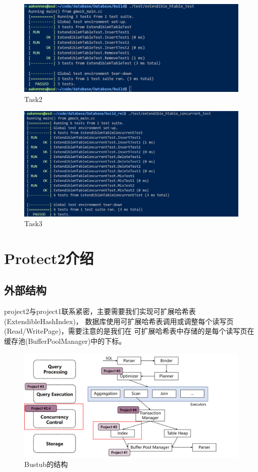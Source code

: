 \documentclass[a4paper]{article}
\begin{document}
\begin{figure}[h!]
   \centering
   \includegraphics[scale=0.33]{20.png}
   \caption{Task2}
   \label{fig:1}
\end{figure}

\begin{figure}[h!]
   \centering
   \includegraphics[scale=0.3]{21.png}
   \caption{Task3}
   \label{fig:1}
\end{figure}

\section{Protect2介绍}

\subsection{外部结构}

project2与project1联系紧密，主要需要我们实现可扩展哈希表(ExtendibleHashIndex)，
数据库使用可扩展哈希表调用或调整每个读写页(Read/WritePage)，需要注意的是我们在
可扩展哈希表中存储的是每个读写页在缓存池(BufferPoolManager)中的下标。

\begin{figure}[h!]
   \centering
   \includegraphics[scale=0.5]{2.png}
   \caption{Bustub的结构}
   \label{fig:1}
\end{figure}
\end{document}
